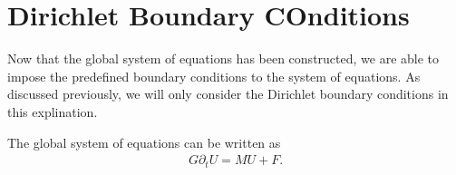 \documentclass[../fem.tex]{subfile}
\begin{document}
\section{Dirichlet Boundary COnditions}%
\label{sec:dirichlet_boundary_conditions}

Now that the global system of equations has been constructed, we are able to
impose the predefined boundary conditions to the system of equations. As
discussed previously, we will only consider the Dirichlet boundary conditions
in this explination.

The global system of equations can be written as
\begin{align*}
   G\partial_t U=MU+F.
\end{align*}
\end{document}
